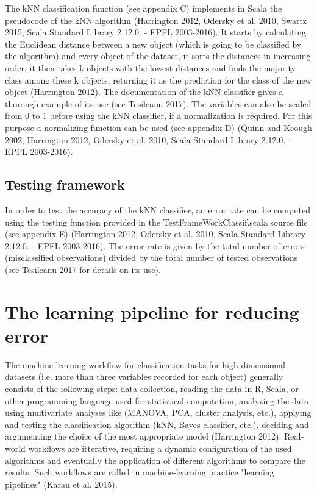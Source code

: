 \documentclass[journal]{IEEEtran}
\begin{document}
The kNN classification function (see appendix C) implements in Scala the pseudocode of the kNN algorithm (Harrington 2012, Odersky et al. 2010, Swartz 2015, Scala Standard Library 2.12.0. - EPFL 2003-2016). 
It starts by calculating the Euclidean distance between a new object (which is going to be classified by the algorithm) and every object of the dataset, it sorts the distances in increasing order, it then takes k objects with the lowest distances and finds the majority class among these k objects, returning it as the prediction for the class of the new object (Harrington 2012).
The documentation of the kNN classifier gives a thorough example of its use (see Tesileanu 2017). 
The variables can also be scaled from 0 to 1 before using the kNN classifier, if a normalization is required. For this purpose a normalizing function can be used (see appendix D) (Quinn and Keough 2002, Harrington 2012, Odersky et al. 2010, Scala Standard Library 2.12.0. - EPFL 2003-2016). 

\subsection{Testing framework}    

In order to test the accuracy of the kNN classifier, an error rate can be computed using the testing function provided in the TestFrameWorkClassif.scala source file (see appendix E) (Harrington 2012, Odersky et al. 2010, Scala Standard Library 2.12.0. - EPFL 2003-2016).
 The error rate is given by the total number of errors (misclassified observations) divided by the total number of tested observations (see Tesileanu 2017 for details on its use). 

\section{The learning pipeline for reducing error}

The machine-learning workflow for classification tasks for high-dimensional datasets (i.e. more than three variables recorded for each object) generally consists of the following steps: data collection, reading the data in R, Scala, or other programming language used for statistical computation, analyzing the data using multivariate analyses like (MANOVA, PCA, cluster analysis, etc.), applying and testing the classification algorithm (kNN, Bayes classifier, etc.), deciding and argumenting the choice of the most appropriate model (Harrington 2012).
 Real-world workflows are itterative, requiring a dynamic configuration of the used algorithms and eventually the application of different algorithms to compare the results.
 Such workflows are called in machine-learning practice "learning pipelines"  (Karau et al. 2015).\\
\end{document}
